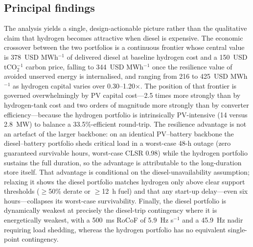 \documentclass[preprint,12pt]{elsarticle}
\begin{document}
\subsection{Principal findings}
The analysis yields a single, design-actionable picture rather than the qualitative
claim that hydrogen becomes attractive when diesel is expensive. The economic
crossover between the two portfolios is a continuous frontier whose central value is
378~USD MWh$^{-1}$ of delivered diesel at baseline hydrogen cost and a
150~USD tCO$_2^{-1}$ carbon price, falling to 344~USD MWh$^{-1}$ once the resilience
value of avoided unserved energy is internalised, and ranging from 216 to
425~USD MWh$^{-1}$ as hydrogen capital varies over 0.30--1.20$\times$. The position
of that frontier is governed overwhelmingly by PV capital cost---2.5 times more
strongly than by hydrogen-tank cost and two orders of magnitude more strongly than
by converter efficiency---because the hydrogen portfolio is intrinsically
PV-intensive (14 versus 2.8~MW) to balance a 33.5\%-efficient round-trip. The
resilience advantage is not an artefact of the larger backbone: on an identical
PV--battery backbone the diesel--battery portfolio sheds critical load in a
worst-case 48-h outage (zero guaranteed survivable hours, worst-case CLSR 0.98)
while the hydrogen portfolio sustains the full duration, so
the advantage is attributable to the long-duration store itself. That advantage is
conditional on the diesel-unavailability assumption; relaxing it shows the diesel
portfolio matches hydrogen only above clear support thresholds ($\ge$50\% derate or
$\ge$12~h fuel) and that any start-up delay---even six hours---collapses its
worst-case survivability. Finally, the diesel portfolio is dynamically weakest at
precisely the diesel-trip contingency where it is energetically weakest, with a
500~ms RoCoF of 5.9~Hz s$^{-1}$ and a 45.9~Hz nadir requiring load shedding, whereas
the hydrogen portfolio has no equivalent single-point contingency.
\end{document}
